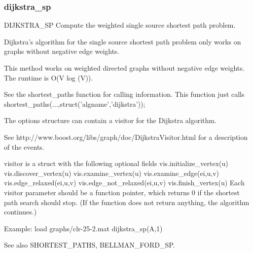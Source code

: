 \subsubsection*{dijkstra\_sp}
\begin{mcode}
  DIJKSTRA_SP Compute the weighted single source shortest path problem.
 
  Dijkstra's algorithm for the single source shortest path problem only
  works on graphs without negative edge weights.
 
  This method works on weighted directed graphs without negative edge
  weights.
  The runtime is O(V log (V)).
 
  See the shortest_paths function for calling information.  This function 
  just calls shortest_paths(...,struct('algname','dijkstra'));
 
  The options structure can contain a visitor for the Dijkstra algorithm.  
 
  See http://www.boost.org/libs/graph/doc/DijkstraVisitor.html for a 
  description of the events.
  
  visitor is a struct with the following optional fields
     vis.initialize_vertex(u)
     vis.discover_vertex(u)
     vis.examine_vertex(u)
     vis.examine_edge(ei,u,v)
     vis.edge_relaxed(ei,u,v)
     vis.edge_not_relaxed(ei,u,v)
     vis.finish_vertex(u)
  Each visitor parameter should be a function pointer, which returns 0
  if the shortest path search should stop.  (If the function does not 
  return anything, the algorithm continues.)
 
  Example:
     load graphs/clr-25-2.mat
     dijkstra_sp(A,1)
 
  See also SHORTEST_PATHS, BELLMAN_FORD_SP.
\end{mcode}
\newpage
